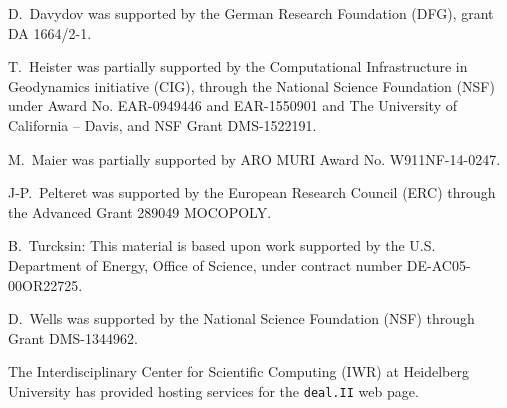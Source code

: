\documentclass{ansarticle-preprint}
\newcommand{\specialword}[1]{\texttt{#1}}
\newcommand{\dealii}{{\specialword{deal.II}}\xspace}
\begin{document}
D.~Davydov was supported by the German Research Foundation (DFG), grant DA
1664/2-1.

T.~Heister was partially supported by the Computational Infrastructure in
Geodynamics initiative (CIG), through the National Science Foundation (NSF)
under Award No. EAR-0949446 and EAR-1550901 and The University of
California -- Davis, and NSF Grant DMS-1522191.

M.~Maier was partially supported by ARO MURI Award No. W911NF-14-0247.

J-P.~Pelteret was supported by the European Research Council (ERC) through
the Advanced Grant 289049 MOCOPOLY.

B.~Turcksin: This material is based upon work supported by the U.S.
Department of Energy, Office of Science, under contract number
DE-AC05-00OR22725.

D.~Wells was supported by the National Science Foundation (NSF) through Grant
DMS-1344962.

The Interdisciplinary Center for Scientific Computing (IWR) at Heidelberg
University has provided hosting services for the \dealii web page.


{}

\end{document}
